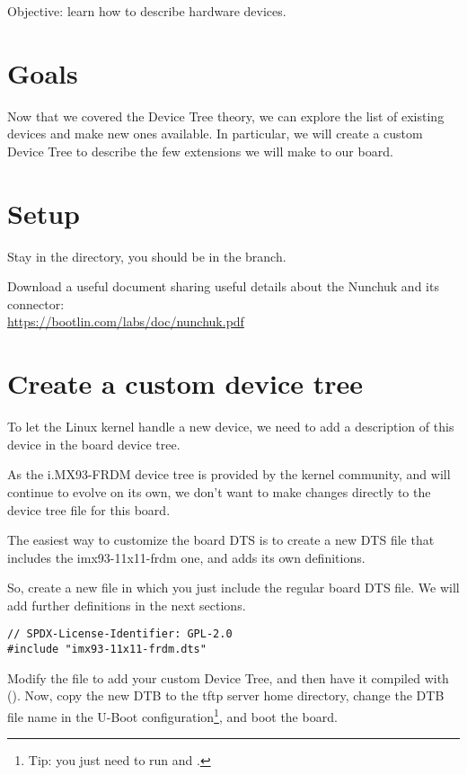 {Objective: learn how to describe hardware devices.}

\section{Goals}

Now that we covered the Device Tree theory, we can explore the list of
existing devices and make new ones available. In particular, we will
create a custom Device Tree to describe the few extensions we will make
to our board.

\section{Setup}

Stay in the  directory,
you should be in the  branch.

Download a useful document sharing useful details about the Nunchuk
and its connector:\\
\url{https://bootlin.com/labs/doc/nunchuk.pdf}

\section{Create a custom device tree}

To let the Linux kernel handle a new device, we need to add a
description of this device in the board device tree.

As the i.MX93-FRDM device tree is provided by the kernel community,
and will continue to evolve on its own, we don't want to make changes
directly to the device tree file for this board.

The easiest way to customize the board DTS is to create a new DTS file
that includes the imx93-11x11-frdm one, and adds
its own definitions.

So, create a new
 file in which
you just include the regular board DTS file. We will add further
definitions in the next sections.

\begin{verbatim}
// SPDX-License-Identifier: GPL-2.0
#include "imx93-11x11-frdm.dts"
\end{verbatim}
Modify the  file to add your custom
Device Tree, and then have it compiled with (). Now,
copy the new DTB to the tftp server home directory, change the DTB file
name in the U-Boot configuration\footnote{Tip: you just need to run
 and .}, and boot the board.

